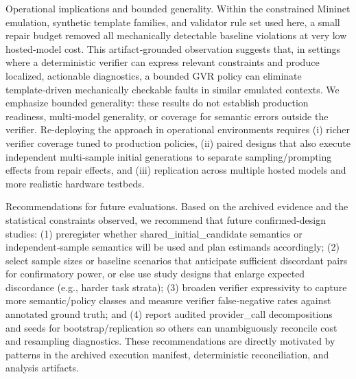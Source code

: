 \documentclass[conference]{IEEEtran}
\begin{document}
Operational implications and bounded generality. Within the constrained Mininet emulation, synthetic template families, and validator rule set used here, a small repair budget removed all mechanically detectable baseline violations at very low hosted‑model cost. This artifact‑grounded observation suggests that, in settings where a deterministic verifier can express relevant constraints and produce localized, actionable diagnostics, a bounded GVR policy can eliminate template‑driven mechanically checkable faults in similar emulated contexts. We emphasize bounded generality: these results do not establish production readiness, multi‑model generality, or coverage for semantic errors outside the verifier. Re-deploying the approach in operational environments requires (i) richer verifier coverage tuned to production policies, (ii) paired designs that also execute independent multi‑sample initial generations to separate sampling/prompting effects from repair effects, and (iii) replication across multiple hosted models and more realistic hardware testbeds.

Recommendations for future evaluations. Based on the archived evidence and the statistical constraints observed, we recommend that future confirmed‑design studies: (1) preregister whether shared\_initial\_candidate semantics or independent‑sample semantics will be used and plan estimands accordingly; (2) select sample sizes or baseline scenarios that anticipate sufficient discordant pairs for confirmatory power, or else use study designs that enlarge expected discordance (e.g., harder task strata); (3) broaden verifier expressivity to capture more semantic/policy classes and measure verifier false‑negative rates against annotated ground truth; and (4) report audited provider\_call decompositions and seeds for bootstrap/replication so others can unambiguously reconcile cost and resampling diagnostics. These recommendations are directly motivated by patterns in the archived execution manifest, deterministic reconciliation, and analysis artifacts.
\end{document}
